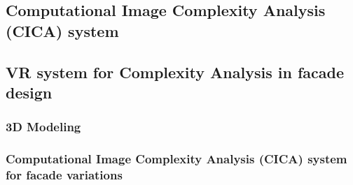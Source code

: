 \documentclass[final,5p,times]{elsarticle}%
\begin{document}
\begin{linenumbers}
    \subsection{Computational Image Complexity Analysis (CICA) system}
    \label{subsec:Computational Image Complexity analysis}
    

    \subsection{VR system for Complexity Analysis in facade design}
    \label{subsec:VRsystemDevelopment}
    

        \subsubsection{3D Modeling}
        \label{subsubsec:Modeling}
        

        \subsubsection{Computational Image Complexity Analysis (CICA) system for facade variations}
        \label{subsubsec:CICAforFacades}
        



\end{linenumbers}
\end{document}
